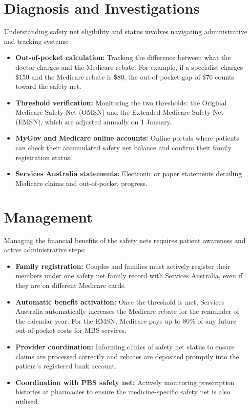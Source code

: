 \section*{Diagnosis and Investigations}
Understanding safety net eligibility and status involves navigating administrative and tracking systems:
\begin{itemize}
    \item \textbf{Out-of-pocket calculation:} Tracking the difference between what the doctor charges and the Medicare rebate. For example, if a specialist charges \$150 and the Medicare rebate is \$80, the out-of-pocket gap of \$70 counts toward the safety net.
    \item \textbf{Threshold verification:} Monitoring the two thresholds: the Original Medicare Safety Net (OMSN) and the Extended Medicare Safety Net (EMSN), which are adjusted annually on 1 January.
    \item \textbf{MyGov and Medicare online accounts:} Online portals where patients can check their accumulated safety net balance and confirm their family registration status.
    \item \textbf{Services Australia statements:} Electronic or paper statements detailing Medicare claims and out-of-pocket progress.
\end{itemize}

\section*{Management}
Managing the financial benefits of the safety nets requires patient awareness and active administrative steps:
\begin{itemize}
    \item \textbf{Family registration:} Couples and families must actively register their members under one safety net family record with Services Australia, even if they are on different Medicare cards.
    \item \textbf{Automatic benefit activation:} Once the threshold is met, Services Australia automatically increases the Medicare rebate for the remainder of the calendar year. For the EMSN, Medicare pays up to 80\% of any future out-of-pocket costs for MBS services.
    \item \textbf{Provider coordination:} Informing clinics of safety net status to ensure claims are processed correctly and rebates are deposited promptly into the patient's registered bank account.
    \item \textbf{Coordination with PBS safety net:} Actively monitoring prescription histories at pharmacies to ensure the medicine-specific safety net is also utilised.
\end{itemize}

